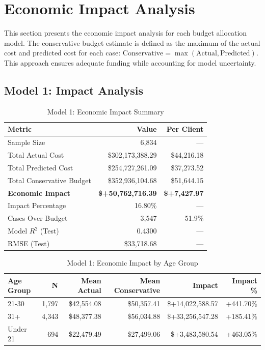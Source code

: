 
\section{Economic Impact Analysis}
\label{sec:economic_impact}

This section presents the economic impact analysis for each budget allocation model. The conservative budget estimate is defined as the maximum of the actual cost and predicted cost for each case: $\text{Conservative} = \max(\text{Actual}, \text{Predicted})$. This approach ensures adequate funding while accounting for model uncertainty.

\subsection{Model 1: Impact Analysis}
\label{subsec:model1_impact}

\begin{table}[htbp]
\centering
\small
\caption{Model 1: Economic Impact Summary}
\label{tab:model1_impact_summary}
\begin{tabular}{lrr}
\toprule
\textbf{Metric} & \textbf{Value} & \textbf{Per Client} \\
\midrule
Sample Size & 6,834 & --- \\
\midrule
Total Actual Cost & \$302,173,388.29 & \$44,216.18 \\
Total Predicted Cost & \$254,727,261.09 & \$37,273.52 \\
Total Conservative Budget & \$352,936,104.68 & \$51,644.15 \\
\midrule
\textbf{Economic Impact} & \textbf{\$+50,762,716.39} & \textbf{\$+7,427.97} \\
Impact Percentage & 16.80\% & --- \\
\midrule
Cases Over Budget & 3,547 & 51.9\% \\
\midrule
Model $R^2$ (Test) & 0.4300 & --- \\
RMSE (Test) & \$33,718.68 & --- \\
\bottomrule
\end{tabular}
\end{table}

\begin{table}[htbp]
\centering
\small
\caption{Model 1: Economic Impact by Age Group}
\label{tab:model1_impact_age}
\begin{tabular}{lrrrrr}
\toprule
\textbf{Age Group} & \textbf{N} & \textbf{Mean Actual} & \textbf{Mean Conservative} & \textbf{Impact} & \textbf{Impact \%} \\
\midrule
21-30 & 1,797 & \$42,554.08 & \$50,357.41 & \$+14,022,588.57 & +441.70\% \\
31+ & 4,343 & \$48,377.38 & \$56,034.88 & \$+33,256,547.28 & +185.41\% \\
Under 21 & 694 & \$22,479.49 & \$27,499.06 & \$+3,483,580.54 & +463.05\% \\
\bottomrule
\end{tabular}
\end{table}

